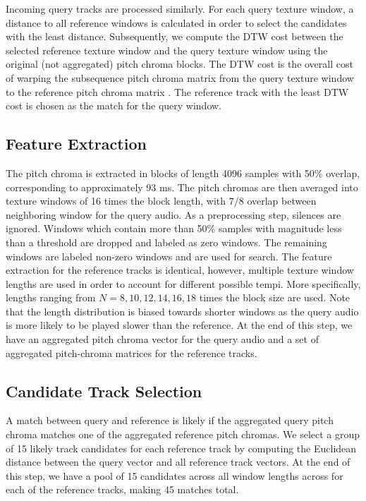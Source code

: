 \documentclass{article}
\begin{document}
Incoming query tracks are processed similarly. For each query texture window, a distance to all reference windows is calculated in order to select the candidates with the least distance. Subsequently, we compute the DTW cost between the selected reference texture window and the query texture window using the original (not aggregated) pitch chroma blocks. The DTW cost is the overall cost of warping the subsequence pitch chroma matrix from the query texture window to the reference pitch chroma matrix \cite{Müller2007}. The reference track with the least DTW cost is chosen as the match for the query window.


\subsection{Feature Extraction}
\label{ref:FeatExt}

The pitch chroma is extracted in blocks of length 4096 samples with 50\% overlap, corresponding to approximately 93 ms. The pitch chromas are then averaged into texture windows of 16 times the block length, with 7/8 overlap between neighboring window for the query audio. As a preprocessing step, silences are ignored. Windows which contain more than 50\% samples with magnitude less than a threshold %
are dropped and labeled as zero windows. The remaining windows are labeled non-zero windows and are used for search.
%
The feature extraction for the reference tracks is identical, however, multiple texture window lengths are used in order to account for different possible tempi. More specifically, lengths ranging from $N=8, 10, 12, 14, 16, 18$ times the block size are used. Note that the length distribution is biased towards shorter windows as the query audio is more likely to be played slower than the reference.
%
At the end of this step, we have an aggregated pitch chroma vector for the query audio and a set of aggregated pitch-chroma matrices for the reference tracks. 

\subsection{Candidate Track Selection}
A match between query and reference is likely if the aggregated query pitch chroma matches one of the aggregated reference pitch chromas.
We select a group of 15 likely track candidates for each reference track by computing the Euclidean distance between the query vector and all reference track vectors.
% 
At the end of this step, we have a pool of 15 candidates across all window lengths across for each of the reference tracks, making 45 matches total.
\end{document}
